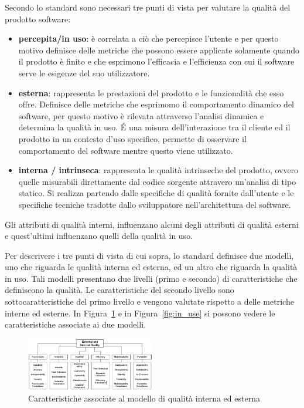 Secondo lo standard sono necessari tre punti di vista per valutare la qualità del prodotto software:
\begin{itemize}
	\item \textbf{percepita/in uso}: è correlata a ciò che percepisce l'utente e per questo motivo definisce delle metriche che possono essere applicate solamente quando il prodotto è finito e che esprimono l'efficacia e l'efficienza con cui il software serve le esigenze del suo utilizzatore. 
	 
	\item \textbf{esterna}: rappresenta le prestazioni del prodotto e le funzionalità che esso offre. Definisce delle metriche che esprimomo il comportamento dinamico del software, per questo motivo è rilevata attraverso l'analisi dinamica e determina la qualità in uso. É una misura dell'interazione tra il cliente ed il prodotto in un contesto d'uso specifico, permette di osservare il comportamento del software mentre questo viene utilizzato. 
	
	\item \textbf{interna / intrinseca}: rappresenta le qualità intrinseche del prodotto, ovvero quelle misurabili direttamente dal codice sorgente attravero un'analisi di tipo statico. Si realizza partendo dalle specifiche di qualità fornite dall'utente e le specifiche tecniche tradotte dallo sviluppatore nell'architettura del software.
\end{itemize}

Gli attributi di qualità interni, influenzano alcuni degli attributi di qualità esterni e quest'ultimi influenzano quelli della qualità in uso.

Per descrivere i tre punti di vista di cui sopra, lo standard definisce due modelli, uno che riguarda le qualità interna ed esterna, ed un altro che riguarda la qualità in uso. Tali modelli presentano due livelli (primo e secondo) di caratteristiche che definiscono la qualità. Le caratteristiche del secondo livello sono sottocaratteristiche del primo livello e vengono valutate rispetto a delle metriche interne ed esterne. In Figura~\ref{fig:int_ext} e in Figura~\ref{fig:in_use} si possono vedere le caratteristiche associate ai due modelli.

\begin{figure}[h!]
	\centering
	\includegraphics[width=0.50\textwidth]{img/int_ext.png}
	\caption{Caratteristiche associate al modello di qualità interna ed esterna}
	\label{fig:int_ext}
\end{figure}


